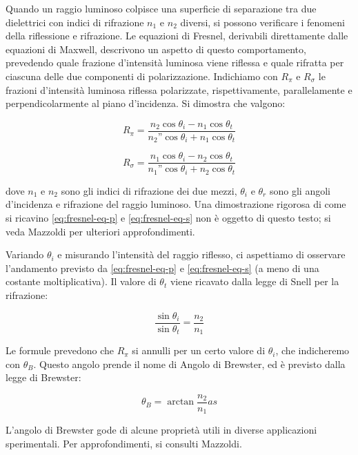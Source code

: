 Quando un raggio luminoso colpisce una superficie di separazione tra due
dielettrici con indici di rifrazione $n_1$ e $n_2$ diversi, si possono verificare
i fenomeni della riflessione e rifrazione.
Le equazioni di Fresnel, derivabili direttamente dalle equazioni di Maxwell, %
descrivono un aspetto di questo comportamento, prevedendo quale frazione d'intensità
luminosa viene riflessa e quale rifratta per ciascuna delle due componenti di
polarizzazione.
Indichiamo con $R_\pi$ e $R_\sigma$ le frazioni d'intensità luminosa riflessa
polarizzate, rispettivamente, parallelamente e perpendicolarmente al piano
d'incidenza.
Si dimostra che valgono:

\begin{equation}
  R_\pi = \frac {
    n_2 \cos{\theta_i} - n_1 \cos{\theta_t}
  } {
    n_2” \cos{\theta_i} + n_1 \cos{\theta_t}
  }\label{eq:fresnel-eq-p}
\end{equation}

\begin{equation}
  R_\sigma = \frac {
    n_1 \cos{\theta_i} - n_2 \cos{\theta_t}
  } {
    n_1” \cos{\theta_i} + n_2 \cos{\theta_t}
  }\label{eq:fresnel-eq-s}
\end{equation}

\vspace{10mm}
\noindent dove $n_1$ e $n_2$ sono gli indici di rifrazione dei due mezzi, $\theta_i$ e
$\theta_r$ sono gli angoli d'incidenza e rifrazione del raggio luminoso.
Una dimostrazione rigorosa di come si ricavino \eqref{eq:fresnel-eq-p} e \eqref{eq:fresnel-eq-s} non è oggetto
di questo testo;
si veda Mazzoldi\cite{mazzoldi98} per ulteriori approfondimenti.

Variando $\theta_i$ e misurando l’intensità del raggio riflesso,
ci aspettiamo di osservare l'andamento previsto da \eqref{eq:fresnel-eq-p} e \eqref{eq:fresnel-eq-s} (a meno di una
costante moltiplicativa).
Il valore di $\theta_t$ viene ricavato dalla legge di Snell per la rifrazione:

\begin{equation}
  \frac {\sin{\theta_i}} {\sin{\theta_t}} = \frac {n_2} {n_1}
  \label{eq:legge-snell}
\end{equation}

\noindent Le formule prevedono che $R_\pi$ si annulli per un certo valore di $\theta_i$,
che indicheremo con $\theta_B$.
Questo angolo prende il nome di Angolo di Brewster, ed è previsto dalla legge di Brewster:

\begin{equation}
  \theta_B = \arctan{
    \frac {n_2} {n_1}as
  }\label{eq:legge-brewster}
\end{equation}

\noindent  L’angolo di Brewster gode di alcune proprietà utili in diverse applicazioni
sperimentali.
Per approfondimenti, si consulti Mazzoldi\cite{mazzoldi98}.
\endinput
